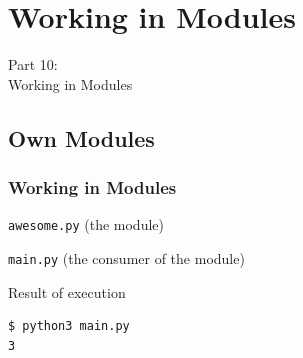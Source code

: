 
{
\renewcommand{\bgcolor}{mods}

\section{Working in Modules}
\begin{frame}
    \vspace{25mm}
    \begin{center}
        \Huge{Part 10:\\Working in Modules}
    \end{center}
\end{frame}

\subsection{Own Modules}
\begin{frame}[fragile]
    \frametitle{Working in Modules }
    \vspace{0mm}
    \begin{center}
      \texttt{awesome.py} (the module)
    \end{center}
    \contentModulesI
    \pause
    
    \vspace{5mm}
    \begin{center}
      \texttt{main.py} (the consumer of the module)
    \end{center}
    \contentModulesII
    \pause
    
    \vspace{5mm}
    \begin{center}
      Result of execution
    \end{center}
    \begin{verbatim}
$ python3 main.py
3
    \end{verbatim}
\end{frame}

}
